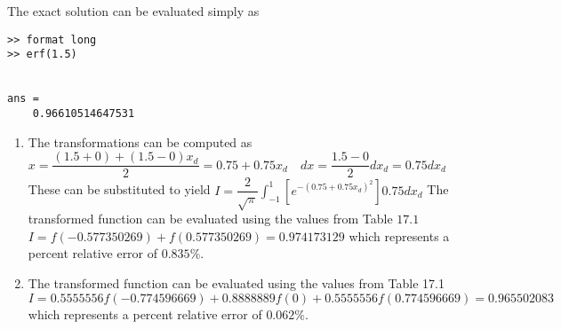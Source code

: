 \documentclass[../main.tex]{subfiles}
\begin{document}
\section{}
The exact solution can be evaluated simply as
	\bigbreak
\begin{lstlisting}[numbers=none]
>> format long
>> erf(1.5)


ans =
	0.96610514647531 
\end{lstlisting}
\begin{enumerate}[label=\bfseries(\alph*)]
\item The transformations can be computed as
	\bigbreak
$x=\dfrac{(1.5+0)+(1.5-0) x_{d}}{2}=0.75+0.75 x_{d} \quad d x=\dfrac{1.5-0}{2} d x_{d}=0.75 d x_{d}$
	\bigbreak
These can be substituted to yield
	\bigbreak
$\displaystyle I=\dfrac{2}{\sqrt{\pi}} \int_{-1}^{1}\left[e^{-\left(0.75+0.75 x_{d}\right)^{2}}\right] 0.75 d x_{d}$
	\bigbreak
The transformed function can be evaluated using the values from Table $17.1$
	\bigbreak
$I=f(-0.577350269)+f(0.577350269)=0.974173129$
	\bigbreak
which represents a percent relative error of $0.835 \%$.
	\bigbreak
\item The transformed function can be evaluated using the values from Table 17.1
	\bigbreak
$I=0.5555556 f(-0.774596669)+0.8888889 f(0)+0.5555556 f(0.774596669)=0.965502083$
	\bigbreak
which represents a percent relative error of $0.062 \%$.
	\bigbreak
\end{enumerate}
\end{document}
